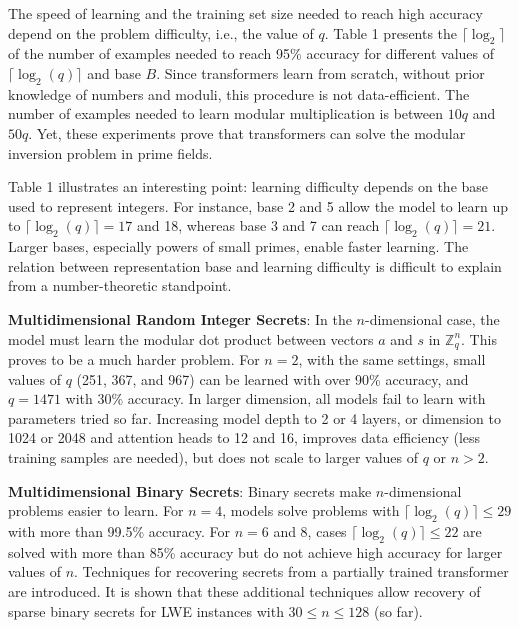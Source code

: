 \documentclass{article}
\begin{document}
The speed of learning and the training set size needed to reach high accuracy depend on the problem difficulty, i.e., the value of \( q \). Table 1 presents the \( \lceil \log_2 \rceil \) of the number of examples needed to reach 95\% accuracy for different values of \( \lceil \log_2(q) \rceil \) and base \( B \). Since transformers learn from scratch, without prior knowledge of numbers and moduli, this procedure is not data-efficient. The number of examples needed to learn modular multiplication is between \( 10q \) and \( 50q \). Yet, these experiments prove that transformers can solve the modular inversion problem in prime fields.

Table 1 illustrates an interesting point: learning difficulty depends on the base used to represent integers. For instance, base 2 and 5 allow the model to learn up to \( \lceil \log_2(q) \rceil = 17 \) and 18, whereas base 3 and 7 can reach \( \lceil \log_2(q) \rceil = 21 \). Larger bases, especially powers of small primes, enable faster learning. The relation between representation base and learning difficulty is difficult to explain from a number-theoretic standpoint.

\textbf{Multidimensional Random Integer Secrets}: In the \( n \)-dimensional case, the model must learn the modular dot product between vectors \( a \) and \( s \) in \( \mathbb{Z}_q^n \). This proves to be a much harder problem. For \( n = 2 \), with the same settings, small values of \( q \) (251, 367, and 967) can be learned with over 90\% accuracy, and \( q = 1471 \) with 30\% accuracy. In larger dimension, all models fail to learn with parameters tried so far. Increasing model depth to 2 or 4 layers, or dimension to 1024 or 2048 and attention heads to 12 and 16, improves data efficiency (less training samples are needed), but does not scale to larger values of \( q \) or \( n > 2 \).

\textbf{Multidimensional Binary Secrets}: Binary secrets make \( n \)-dimensional problems easier to learn. For \( n = 4 \), models solve problems with \( \lceil \log_2(q) \rceil \leq 29 \) with more than 99.5\% accuracy. For \( n = 6 \) and 8, cases \( \lceil \log_2(q) \rceil \leq 22 \) are solved with more than 85\% accuracy but do not achieve high accuracy for larger values of \( n \). Techniques for recovering secrets from a partially trained transformer are introduced. It is shown that these additional techniques allow recovery of sparse binary secrets for LWE instances with \( 30 \leq n \leq 128 \) (so far).
\end{document}
